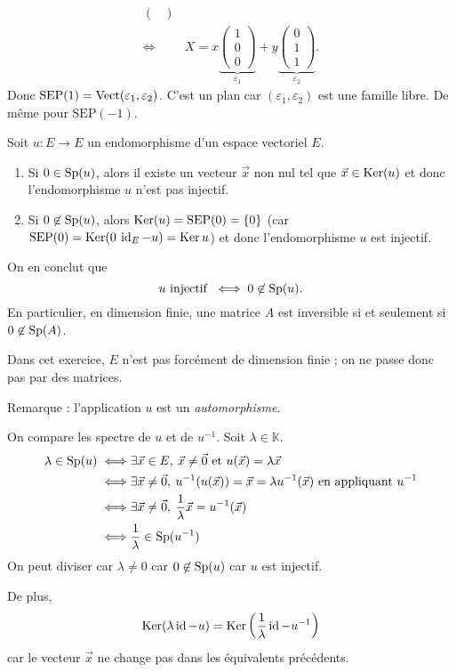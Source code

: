 \begin{exo}
\begin{align*}
\begin{pmatrix}
		\end{pmatrix}\\
		\iff& X = x \underbrace{\begin{pmatrix}
			1\\0\\0
		\end{pmatrix}}_{\varepsilon_1} + y \underbrace{\begin{pmatrix}
			0\\1\\1
		\end{pmatrix}}_{\varepsilon_2}.
	\end{align*}
	Donc $\mathrm{SEP}(1) = \operatorname{Vect}(\varepsilon_1, \varepsilon_2)$. C'est un plan car $(\varepsilon_1, \varepsilon_2)$\/ est une famille libre.
	De même pour $\mathrm{SEP}(-1)$.
\end{exo}

\begin{rmk}
	Soit $u : E \to E$\/ un endomorphisme d'un espace vectoriel $E$.
	\begin{enumerate}
		\item Si $0 \in \operatorname{Sp}(u)$, alors il existe un vecteur $\vec{x}$\/ non nul tel que $\vec{x} \in \operatorname{Ker}(u)$\/ et donc l'endomorphisme $u$\/ n'est pas injectif.
		\item Si $0 \not\in \operatorname{Sp}(u)$, alors $\operatorname{Ker}(u) = \mathrm{SEP}(0) = \{0\}$ (car $\mathrm{SEP}(0) = \operatorname{Ker}(0\:\operatorname{id}_E - u) = \operatorname{Ker} u$) et donc l'endomorphisme $u$\/ est injectif.
	\end{enumerate}
	On en conclut que \[
		u \text{ injectif } \iff 0 \not\in \operatorname{Sp}(u)
	.\]
	En particulier, en dimension finie, une matrice $A$\/ est inversible si et seulement si $0 \not\in \operatorname{Sp}(A)$.
\end{rmk}

\begin{exo}
	Dans cet exercice, $E$\/ n'est pas forcément de dimension finie ; on ne passe donc pas par des matrices.

	\noindent Remarque : l'application $u$\/ est un {\it automorphisme}.

	On compare les spectre de $u$\/ et de $u^{-1}$. Soit $\lambda \in \mathds{K}$.
	\begin{align*}
		\lambda \in \operatorname{Sp}(u) \iff& \exists \vec{x} \in E,\:\vec{x} \neq \vec{0} \text{ et } u(\vec{x}) = \lambda \vec{x}\\
		\iff& \exists \vec{x} \neq \vec{0},\:u^{-1}(u(\vec{x})) = \vec{x} = \lambda u^{-1}(\vec{x}) \text{ en appliquant } u^{-1}\\
		\iff& \exists \vec{x} \neq \vec{0},\:\frac{1}{\lambda}\vec{x} = u^{-1}(\vec{x})\\
		\iff& \frac{1}{\lambda} \in \operatorname{Sp}(u^{-1})
	\end{align*}
	On peut diviser car $\lambda \neq 0$\/ car $0 \not\in \operatorname{Sp}(u)$\/ car $u$\/ est injectif.

	De plus, \[
		\operatorname{Ker}(\lambda \operatorname{id} - u) = \operatorname{Ker}\left( \frac{1}{\lambda} \operatorname{id} - u^{-1} \right)
	\] car le vecteur $\vec{x}$\/ ne change pas dans les équivalents précédents.
\end{exo}

